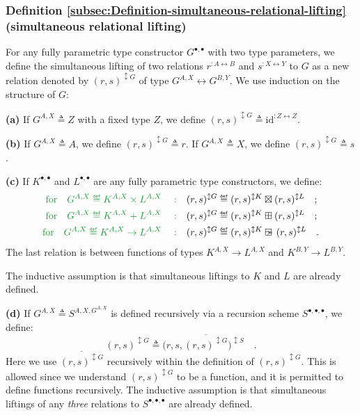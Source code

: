 \subsubsection{Definition \label{subsec:Definition-simultaneous-relational-lifting}\ref{subsec:Definition-simultaneous-relational-lifting}
(simultaneous relational lifting)}

For any fully parametric type constructor $G^{\bullet,\bullet}$ with
two type parameters, we define the simultaneous lifting of two relations
$r^{:A\leftrightarrow B}$ and $s^{:X\leftrightarrow Y}$ to $G$
as a new relation denoted by $(r,s)^{\updownarrow G}$ of type $G^{A,X}\leftrightarrow G^{B,Y}$.
We use induction on the structure of $G$:

\textbf{(a)} If $G^{A,X}\triangleq Z$ with a fixed type $Z$, we
define $(r,s)^{\updownarrow G}\triangleq\text{id}^{:Z\leftrightarrow Z}$.

\textbf{(b)} If $G^{A,X}\triangleq A$, we define $(r,s)^{\updownarrow G}\triangleq r$.
If $G^{A,X}\triangleq X$, we define $(r,s)^{\updownarrow G}\triangleq s$.

\textbf{(c)} If $K^{\bullet,\bullet}$ and $L^{\bullet,\bullet}$
are any fully parametric type constructors, we define: 
\begin{align*}
{\color{greenunder}\text{for}\quad G^{A,X}\triangleq K^{A,X}\times L^{A,X}\quad:}\quad & (r,s)^{\updownarrow G}\triangleq(r,s)^{\updownarrow K}\boxtimes(r,s)^{\updownarrow L}\quad;\\
{\color{greenunder}\text{for}\quad G^{A,X}\triangleq K^{A,X}+L^{A,X}\quad:}\quad & (r,s)^{\updownarrow G}\triangleq(r,s)^{\updownarrow K}\boxplus(r,s)^{\updownarrow L}\quad;\\
{\color{greenunder}\text{for}\quad G^{A,X}\triangleq K^{A,X}\rightarrow L^{A,X}\quad:}\quad & (r,s)^{\updownarrow G}\triangleq(r,s)^{\updownarrow K}\ogreaterthan(r,s)^{\updownarrow L}\quad.
\end{align*}
The last relation is between functions of types $K^{A,X}\rightarrow L^{A,X}$
and $K^{B,Y}\rightarrow L^{B,Y}$. 

The inductive assumption is that simultaneous liftings to $K$ and
$L$ are already defined.

\textbf{(d)} If $G^{A,X}\triangleq S^{A,X,G^{A,X}}$ is defined recursively
via a recursion scheme $S^{\bullet,\bullet,\bullet}$, we define:
\[
(r,s)^{\updownarrow G}\triangleq\big(r,s,\overline{(r,s)^{\updownarrow G}}\big)^{\updownarrow S}\quad.
\]
Here we use $\overline{(r,s)^{\updownarrow G}}$ recursively within
the definition of $(r,s)^{\updownarrow G}$. This is allowed since
we understand $(r,s)^{\updownarrow G}$ to be a function, and it is
permitted to define functions recursively. The inductive assumption
is that simultaneous liftings of any \emph{three} relations to $S^{\bullet,\bullet,\bullet}$
are already defined. 

